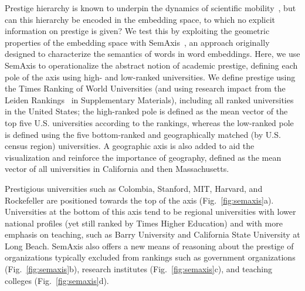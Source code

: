 \documentclass[12pt]{article} %
\begin{document}
Prestige hierarchy is known to underpin the dynamics of scientific mobility~\autocite{deville2014career, clauset2015hierarchy}, but can this hierarchy be encoded in the embedding space, to which no explicit information on prestige is given?
We test this by exploiting the geometric properties of the embedding space with SemAxis~\autocite{an2018semaxis}, an approach originally designed to characterize the semantics of words in word embeddings.
Here, we use SemAxis to operationalize the abstract notion of academic prestige, defining each pole of the axis using high- and low-ranked universities. 
We define prestige using the Times Ranking of World Universities (and using research impact from the Leiden Rankings~\autocite{waltman2012leidenrankings} in Supplementary Materials), including all ranked universities in the United States;
the high-ranked pole is defined as the mean vector of the top five U.S. universities according to the rankings, whereas the low-ranked pole is defined using the five bottom-ranked and geographically matched (by U.S. census region) universities.
A geographic axis is also added to aid the visualization and reinforce the importance of geography, defined as the mean vector of all universities in California and then Massachusetts. 

Prestigious universities such as Colombia, Stanford, MIT, Harvard, and Rockefeller are positioned towards the top of the axis (Fig.~\ref{fig:semaxis}a).
Universities at the bottom of this axis tend to be regional universities with lower national profiles (yet still ranked by Times Higher Education) and with more emphasis on teaching, such as Barry University and California State University at Long Beach.
SemAxis also offers a new means of reasoning about the prestige of organizations typically excluded from rankings such as government organizations (Fig.~\ref{fig:semaxis}b), research institutes (Fig.~\ref{fig:semaxis}c), and teaching colleges (Fig.~\ref{fig:semaxis}d).
\end{document}
